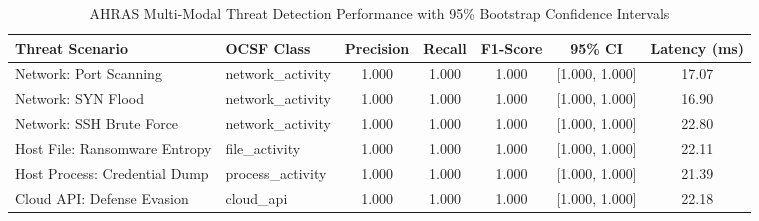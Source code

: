 \begin{table}[htbp]
\centering
\small
\caption{AHRAS Multi-Modal Threat Detection Performance with 95\% Bootstrap Confidence Intervals}
\label{tab:ahras_benchmarks}
\begin{tabular}{l l c c c c c}
\hline
\textbf{Threat Scenario} & \textbf{OCSF Class} & \textbf{Precision} & \textbf{Recall} & \textbf{F1-Score} & \textbf{95\% CI} & \textbf{Latency (ms)} \\
\hline
Network: Port Scanning & network_activity & 1.000 & 1.000 & 1.000 & [1.000, 1.000] & 17.07 \\
Network: SYN Flood & network_activity & 1.000 & 1.000 & 1.000 & [1.000, 1.000] & 16.90 \\
Network: SSH Brute Force & network_activity & 1.000 & 1.000 & 1.000 & [1.000, 1.000] & 22.80 \\
Host File: Ransomware Entropy & file_activity & 1.000 & 1.000 & 1.000 & [1.000, 1.000] & 22.11 \\
Host Process: Credential Dump & process_activity & 1.000 & 1.000 & 1.000 & [1.000, 1.000] & 21.39 \\
Cloud API: Defense Evasion & cloud_api & 1.000 & 1.000 & 1.000 & [1.000, 1.000] & 22.18 \\
\hline
\end{tabular}
\end{table}